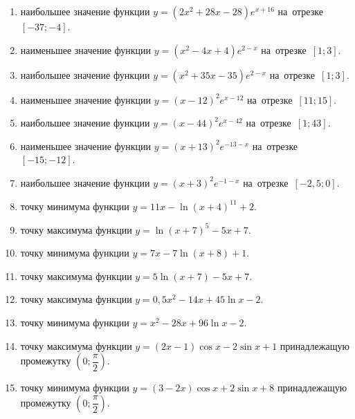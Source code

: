 \documentclass[a4paper,10pt]{article}
\begin{document}
\begin{enumerate}
\item {} наибольшее значение функции $y=\left(2x^2 +28x -28\right)e^{x+16}$ на~отрезке~$\left[-37;-4\right]$.

\item {} наименьшее значение функции $y=\left(x^2 -4x +4\right)e^{2-x}$ на~отрезке~$\left[1;3\right]$.

\item {} наибольшее значение функции $y=\left(x^2 +35x -35\right)e^{2-x}$ на~отрезке~$\left[1;3\right]$.

\item {} наименьшее значение функции $y=\left(x-12\right)^2e^{x-12}$ на~отрезке~$\left[11;15\right]$.

\item {} наибольшее значение функции $y=\left(x-44\right)^2e^{x-42}$ на~отрезке~$\left[1;43\right]$.

\item {} наименьшее значение функции $y=\left(x+13\right)^2e^{-13-x}$ на~отрезке~$\left[-15;-12\right]$.

\item {} наибольшее значение функции $y=\left(x+3\right)^2e^{-1-x}$ на~отрезке~$\left[-2,5;0\right]$.

\item {} точку минимума функции $y=11x-\ln\left(x+4\right)^{11}+2$.

\item {} точку максимума функции $y=\ln\left(x+7\right)^{5}-5x+7$.

\item {} точку минимума функции $y=7x-7\ln\left(x+8\right)+1$.

\item {} точку максимума функции $y=5\ln\left(x+7\right)-5x+7$.

\item {} точку максимума функции $y=0,5x^2-14x+45\ln x -2$.

\item {} точку минимума функции $y=x^2-28x+96\ln x -2$.

\item {} точку максимума функции $y=\left(2x-1\right)\cos x -2\sin x+1$
принадлежащую промежутку $\left(0;\dfrac{\pi}{2}\right)$.

\item {} точку минимума функции $y=\left(3-2x\right)\cos x +2\sin x+8$
принадлежащую промежутку $\left(0;\dfrac{\pi}{2}\right)$.


\end{enumerate}
\end{document}
